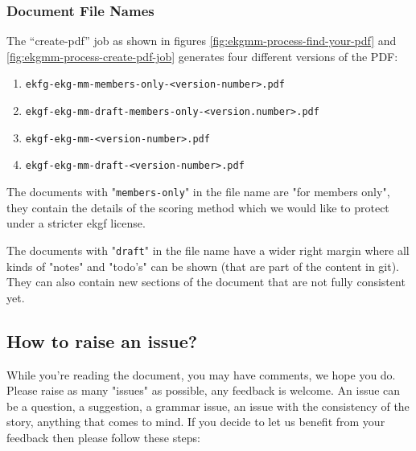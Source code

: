 \subsubsection{Document File Names}
\label{subsec:ekg-mm-process-document-file-names}

The “create-pdf” job as shown in figures \ref{fig:ekgmm-process-find-your-pdf}
and \ref{fig:ekgmm-process-create-pdf-job} generates four different versions of the PDF:

\begin{enumerate}[leftmargin=1.2em,font=\footnotesize]
    \item {\footnotesize\texttt{ekfg-ekg-mm-members-only-<version-number>.pdf}}
    \item {\footnotesize\texttt{ekgf-ekg-mm-draft-members-only-<version.number>.pdf}}
    \item {\footnotesize\texttt{ekgf-ekg-mm-<version-number>.pdf}}
    \item {\footnotesize\texttt{ekgf-ekg-mm-draft-<version-number>.pdf}}
\end{enumerate}


The documents with "\texttt{members-only}" in the file name are "for members only",
they contain the details of the scoring method which we would like to
protect under a stricter \gls{ekgf} license.

The documents with "\texttt{draft}" in the file name have a wider right margin 
where all kinds of "notes" and "todo’s" can be shown
(that are part of the content in git). 
They can also contain new sections of the document that are not fully consistent yet.

\subsection{How to raise an issue?}
\label{subsec:ekg-mm-process-how-to-raise-an-issue}

While you’re reading the document, you may have comments, we hope you do.
Please raise as many "issues" as possible, any feedback is welcome.
An issue can be a question, a suggestion, a grammar issue, 
an issue with the consistency of the story, anything that comes to mind. 
If you decide to let us benefit from your feedback then please follow these steps:

